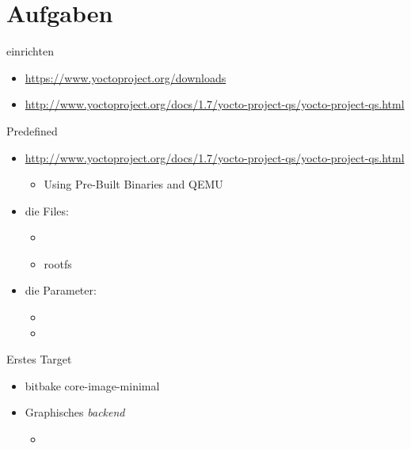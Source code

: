 \section{Aufgaben}
\begin{frame}{\yocto}{einrichten}
 \begin{itemize}
  \item {\tiny \url{https://www.yoctoproject.org/downloads}}
  \item {\tiny\url{http://www.yoctoproject.org/docs/1.7/yocto-project-qs/yocto-project-qs.html}}
 \end{itemize}
\end{frame}

\begin{frame}{\yocto}{Predefined}
 \begin{itemize}
  \item {\tiny\url{http://www.yoctoproject.org/docs/1.7/yocto-project-qs/yocto-project-qs.html}}
  \begin{itemize}
   \item Using Pre-Built Binaries and QEMU
  \end{itemize}
  \item die Files:
  \begin{itemize}
   \item {} 
   \item {} rootfs
  \end{itemize}
  \item {} die Parameter:
  \begin{itemize}
   \item {}
   \item {}
  \end{itemize}
 \end{itemize} 
\end{frame}

\begin{frame}{\yocto}{Erstes Target}
\begin{itemize}
 \item bitbake core-image-minimal
 \item Graphisches {\em backend}
 \begin{itemize}
  \item {}
 \end{itemize}
\end{itemize}
\end{frame}

